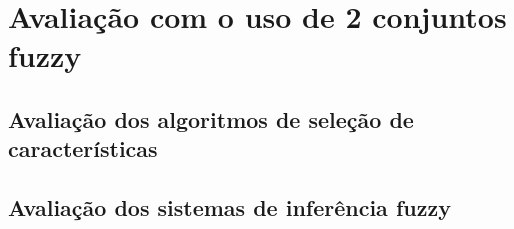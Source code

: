 \documentclass[template.tex]{subfiles}
\begin{document}
\section{Avaliação com o uso de 2 conjuntos fuzzy}
\subsection{Avaliação dos algoritmos de seleção de características}
\subsection{Avaliação dos sistemas de inferência fuzzy}



%
%
%
\end{document}
